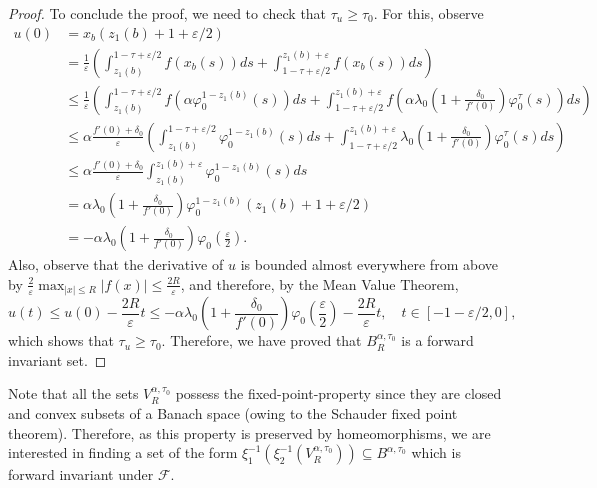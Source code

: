 \documentclass[a4paper,11pt]{article}
\theoremstyle{plain}
\theoremstyle{definition}
\theoremstyle{definition}
\newcommand{\Fcal}{\mathcal{F}}
\numberwithin{equation}{section}
\begin{document}
\begin{proof}
To conclude the proof, we need to check that $\tau_u\geq \tau_0$. For this, observe
\begin{align*}
    u(0) &= x_b(z_1(b)+1+\varepsilon/2) \\
    &= \frac{1}{\varepsilon} \left( \int_{z_1(b)}^{1-\tau+\varepsilon/2} f(x_b(s)) ds + \int_{1-\tau+\varepsilon/2}^{z_1(b)+\varepsilon} f(x_b(s)) ds \right) \\
    &\leq \frac{1}{\varepsilon} \left(  \int_{z_1(b)}^{1-\tau+\varepsilon/2} f(\alpha\varphi_0^{1-z_1(b)}(s)) ds + \int_{1-\tau+\varepsilon/2}^{z_1(b)+\varepsilon} f\left( \alpha\lambda_0\left( 1+\frac{\delta_0}{f'(0)} \right) \varphi_0^\tau(s) \right) ds \right) \\
    &\leq \alpha\frac{f'(0)+\delta_0}{\varepsilon} \left(  \int_{z_1(b)}^{1-\tau+\varepsilon/2} \varphi_0^{1-z_1(b)}(s) ds + \int_{1-\tau+\varepsilon/2}^{z_1(b)+\varepsilon} \lambda_0 \left( 1+\frac{\delta_0}{f'(0)} \right) \varphi_0^\tau(s) ds \right) \\
    &\leq \alpha\frac{f'(0)+\delta_0}{\varepsilon} \int_{z_1(b)}^{z_1(b)+\varepsilon} \varphi_0^{1-z_1(b)}(s) ds \\
    &= \alpha\lambda_0\left( 1+\frac{\delta_0}{f'(0)} \right) \varphi_0^{1-z_1(b)}(z_1(b)+1+\varepsilon/2) \\
    &= -\alpha\lambda_0\left( 1+\frac{\delta_0}{f'(0)} \right) \varphi_0\left( \frac{\varepsilon}{2} \right).
\end{align*}
Also, observe that the derivative of $u$ is bounded almost everywhere from above by $\frac{2}{\varepsilon}\max_{|x|\leq R} |f(x)|\leq \frac{2R}{\varepsilon}$, and therefore, by the Mean Value Theorem,
\[
    u(t) \leq u(0) - \frac{2R}{\varepsilon}t \leq - \alpha\lambda_0 \left( 1+\frac{\delta_0}{f'(0)} \right) \varphi_0\left( \frac{\varepsilon}{2} \right) - \frac{2R}{\varepsilon}t, \quad t\in[-1-\varepsilon/2,0],
\]
which shows that $\tau_u \geq \tau_0$. Therefore, we have proved that $B^{\alpha,\tau_0}_R$ is a forward invariant set.
\end{proof}

Note that all the sets $V^{\alpha,\tau_0}_R$ possess the fixed-point-property since they are closed and convex subsets of a Banach space (owing to the Schauder fixed point theorem). Therefore, as this property is preserved by homeomorphisms, we are interested in finding a set of the form $\xi_1^{-1}(\xi_2^{-1}(V^{\alpha,\tau_0}_R))\subseteq B^{\alpha,\tau_0}$ which is forward invariant under $\Fcal$.
\end{document}
